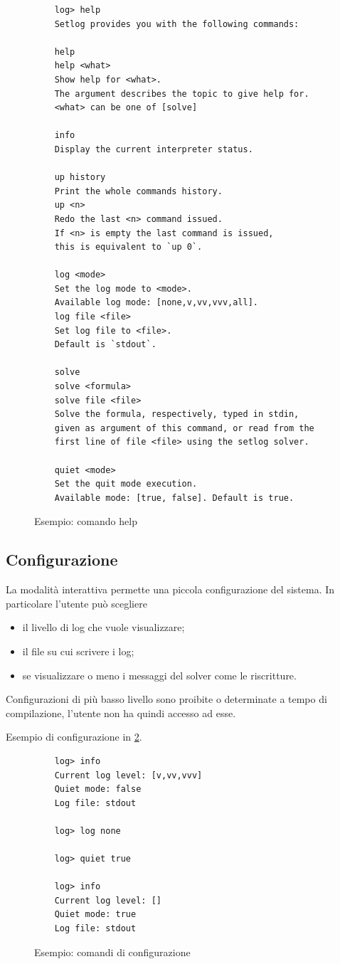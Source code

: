 \documentclass[12pt,a4paper,openright]{book} %
\begin{document}
\begin{figure}
	\begin{verbatim}
	log> help
	Setlog provides you with the following commands:

	help
	help <what>
	Show help for <what>.
	The argument describes the topic to give help for.
	<what> can be one of [solve]

	info
	Display the current interpreter status.

	up history
	Print the whole commands history.
	up <n>
	Redo the last <n> command issued.
	If <n> is empty the last command is issued,
	this is equivalent to `up 0`.

	log <mode>
	Set the log mode to <mode>.
	Available log mode: [none,v,vv,vvv,all].
	log file <file>
	Set log file to <file>.
	Default is `stdout`.

	solve
	solve <formula>
	solve file <file>
	Solve the formula, respectively, typed in stdin,
	given as argument of this command, or read from the
	first line of file <file> using the setlog solver.

	quiet <mode>
	Set the quit mode execution.
	Available mode: [true, false]. Default is true.
	\end{verbatim}

	\caption{Esempio: comando help}
	\label{fig:example_helpcommand}
\end{figure}

\subsection{Configurazione}

La modalità interattiva permette una piccola configurazione del
sistema. In particolare l'utente può scegliere
\begin{itemize}
	\item il livello di log che vuole visualizzare;
	\item il file su cui scrivere i log;
	\item se visualizzare o meno i messaggi del solver come le
          riscritture.
\end{itemize}

Configurazioni di più basso livello sono proibite o determinate a
tempo di compilazione, l'utente non ha quindi accesso ad esse.

Esempio di configurazione in \ref{fig:example_confcommands}.

\begin{figure}
	\begin{verbatim}
	log> info
	Current log level: [v,vv,vvv]
	Quiet mode: false
	Log file: stdout

	log> log none

	log> quiet true

	log> info
	Current log level: []
	Quiet mode: true
	Log file: stdout
	\end{verbatim}
	\caption{Esempio: comandi di configurazione}
	\label{fig:example_confcommands}
\end{figure}
\end{document}

